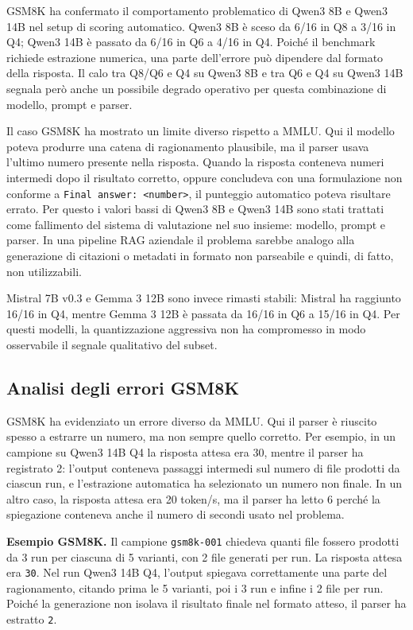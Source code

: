GSM8K ha confermato il comportamento problematico di Qwen3 8B e Qwen3 14B nel
setup di scoring automatico. Qwen3 8B è sceso da 6/16 in Q8 a 3/16 in Q4;
Qwen3 14B è passato da 6/16 in Q6 a 4/16 in Q4. Poiché il benchmark richiede estrazione
numerica, una parte dell'errore può dipendere dal formato della risposta. Il
calo tra Q8/Q6 e Q4 su Qwen3 8B e tra Q6 e Q4 su Qwen3 14B segnala però anche
un possibile degrado operativo per questa combinazione di modello, prompt e
parser.

Il caso GSM8K ha mostrato un limite diverso rispetto a MMLU. Qui il modello
poteva produrre una catena di ragionamento plausibile, ma il parser usava
l'ultimo numero presente nella risposta. Quando la risposta conteneva numeri
intermedi dopo il risultato corretto, oppure concludeva con una formulazione
non conforme a \texttt{Final answer: <number>}, il punteggio automatico poteva
risultare errato. Per questo i valori bassi di Qwen3 8B e Qwen3 14B sono stati
trattati come fallimento del sistema di valutazione nel suo insieme: modello,
prompt e parser. In una pipeline RAG aziendale il problema sarebbe analogo alla
generazione di citazioni o metadati in formato non parseabile e quindi, di fatto, 
non utilizzabili.

Mistral 7B v0.3 e Gemma 3 12B sono invece rimasti stabili: Mistral ha raggiunto
16/16 in Q4, mentre Gemma 3 12B è passata da 16/16 in Q6 a 15/16 in Q4. Per
questi modelli, la quantizzazione aggressiva non ha compromesso in modo
osservabile il segnale qualitativo del subset.

\subsection{Analisi degli errori GSM8K}
\label{subsec:evaluation_gsm8k_errors}

GSM8K ha evidenziato un errore diverso da MMLU. Qui il parser è riuscito spesso
a estrarre un numero, ma non sempre quello corretto. Per esempio, in un campione
su Qwen3 14B Q4 la risposta attesa era 30, mentre il parser ha registrato 2:
l'output conteneva passaggi intermedi sul numero di file prodotti da ciascun
run, e l'estrazione automatica ha selezionato un numero non finale. In un altro
caso, la risposta attesa era 20 token/s, ma il parser ha letto 6 perché la
spiegazione conteneva anche il numero di secondi usato nel problema.

\begin{center}
\begin{minipage}{0.88\textwidth}
\small
\textbf{Esempio GSM8K.} Il campione \texttt{gsm8k-001} chiedeva quanti file
fossero prodotti da 3 run per ciascuna di 5 varianti, con 2 file generati per
run. La risposta attesa era \texttt{30}. Nel run Qwen3 14B Q4, l'output
spiegava correttamente una parte del ragionamento, citando prima le 5 varianti,
poi i 3 run e infine i 2 file per run. Poiché la generazione non isolava il
risultato finale nel formato atteso, il parser ha estratto \texttt{2}.
\end{minipage}
\end{center}

